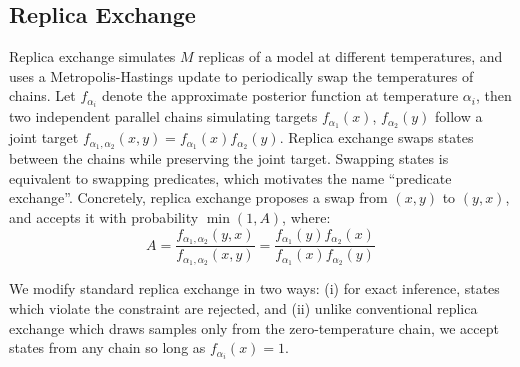   
\subsection{Replica Exchange}\label{replicaexchange}
Replica exchange \citep{swendsen1986replica} simulates $M$ replicas of a model at different temperatures, and uses a Metropolis-Hastings update to  periodically swap the temperatures of chains.
Let $f_{\alpha_i}$ denote the approximate posterior function at temperature $\alpha_i$, then two independent parallel chains simulating targets $f_{\alpha_1}(x)$, $f_{\alpha_2}(y)$  follow a joint target $f_{\alpha_1, \alpha_2}(x,y) = f_{\alpha_1}(x)f_{\alpha_2}(y)$.
Replica exchange swaps states between the chains while preserving the joint target.
Swapping states is equivalent to swapping predicates, which motivates the name ``predicate exchange''.
Concretely, replica exchange proposes a swap from $(x, y)$ to $(y, x)$, and accepts it with probability $\min(1, A)$, where:
\begin{equation}
A =  \frac{f_{\alpha_1, \alpha_2}(y,x)}{f_{\alpha_1, \alpha_2}(x,y)} = \frac{f_{\alpha_1}(y)f_{\alpha_2}(x)}{f_{\alpha_1}(x)f_{\alpha_2}(y)}
\end{equation}

We modify standard replica exchange in two ways: (i) for exact inference, states which violate the constraint are rejected, and (ii)
unlike conventional replica exchange which draws samples only from the zero-temperature chain, we accept states from any chain so long as $f_{\alpha_i}(x) = 1$.







